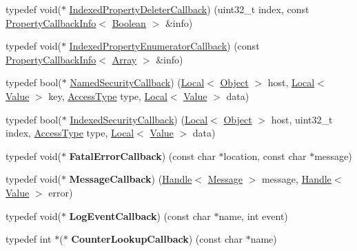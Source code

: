\begin{DoxyCompactItemize}
\item 
typedef void($\ast$ \hyperlink{namespacev8_a53863728de14cde48dd6543207b2f2da}{Indexed\+Property\+Deleter\+Callback}) (uint32\+\_\+t index, const \hyperlink{classv8_1_1_property_callback_info}{Property\+Callback\+Info}$<$ \hyperlink{classv8_1_1_boolean}{Boolean} $>$ \&info)
\item 
typedef void($\ast$ \hyperlink{namespacev8_adbb0a6d5537371953f9ba807d4f6275e}{Indexed\+Property\+Enumerator\+Callback}) (const \hyperlink{classv8_1_1_property_callback_info}{Property\+Callback\+Info}$<$ \hyperlink{classv8_1_1_array}{Array} $>$ \&info)
\item 
typedef bool($\ast$ \hyperlink{namespacev8_ab5cafda0c556bba990c660ce9c904e0d}{Named\+Security\+Callback}) (\hyperlink{classv8_1_1_local}{Local}$<$ \hyperlink{classv8_1_1_object}{Object} $>$ host, \hyperlink{classv8_1_1_local}{Local}$<$ \hyperlink{classv8_1_1_value}{Value} $>$ key, \hyperlink{namespacev8_add8bef6469c5b94706584124e610046c}{Access\+Type} type, \hyperlink{classv8_1_1_local}{Local}$<$ \hyperlink{classv8_1_1_value}{Value} $>$ data)
\item 
typedef bool($\ast$ \hyperlink{namespacev8_aebbcc7837753e51112d944ad96520da1}{Indexed\+Security\+Callback}) (\hyperlink{classv8_1_1_local}{Local}$<$ \hyperlink{classv8_1_1_object}{Object} $>$ host, uint32\+\_\+t index, \hyperlink{namespacev8_add8bef6469c5b94706584124e610046c}{Access\+Type} type, \hyperlink{classv8_1_1_local}{Local}$<$ \hyperlink{classv8_1_1_value}{Value} $>$ data)
\item 
\hypertarget{namespacev8_abc93f69508701f18dc5cc0ce165616aa}{}typedef void($\ast$ {\bfseries Fatal\+Error\+Callback}) (const char $\ast$location, const char $\ast$message)\label{namespacev8_abc93f69508701f18dc5cc0ce165616aa}

\item 
\hypertarget{namespacev8_a26f4f3ae680876d9408a11d86f4e543d}{}typedef void($\ast$ {\bfseries Message\+Callback}) (\hyperlink{classv8_1_1_handle}{Handle}$<$ \hyperlink{classv8_1_1_message}{Message} $>$ message, \hyperlink{classv8_1_1_handle}{Handle}$<$ \hyperlink{classv8_1_1_value}{Value} $>$ error)\label{namespacev8_a26f4f3ae680876d9408a11d86f4e543d}

\item 
\hypertarget{namespacev8_a1516c6948fdca41f79410b7ff91aeaf0}{}typedef void($\ast$ {\bfseries Log\+Event\+Callback}) (const char $\ast$name, int event)\label{namespacev8_a1516c6948fdca41f79410b7ff91aeaf0}

\item 
\hypertarget{namespacev8_a5efca05a9f1f278a4eec832ce419104f}{}typedef int $\ast$($\ast$ {\bfseries Counter\+Lookup\+Callback}) (const char $\ast$name)\label{namespacev8_a5efca05a9f1f278a4eec832ce419104f}


\end{DoxyCompactItemize}
